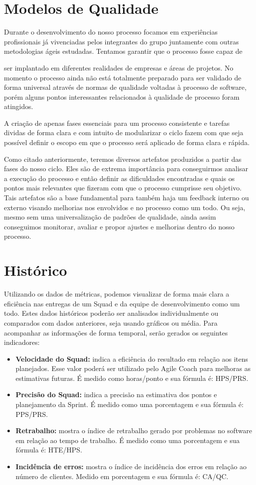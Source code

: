 \documentclass[	DIV=calc,%
							paper=a4,%
							fontsize=12pt,%
							onecolumn]{scrartcl}	 					%
\begin{document}
\section{Modelos de Qualidade}
Durante o desenvolvimento do nosso processo focamos em experiências profissionais já vivenciadas pelos integrantes do grupo juntamente com outras metodologias ágeis estudadas. Tentamos garantir que o processo fosse capaz de

ser implantado em diferentes realidades de empresas e áreas de projetos. No momento o processo ainda não está totalmente preparado para ser validado de forma universal através de normas de qualidade voltadas à processo de software, porém alguns pontos interessantes relacionados à qualidade de processo foram atingidos.

A criação de apenas fases essenciais para um processo consistente e tarefas dividas de forma clara e com intuito de modularizar o ciclo fazem com que seja possível definir o escopo em que o processo será aplicado de forma clara e rápida.

Como citado anteriormente, teremos diversos artefatos produzidos a partir das fases do nosso ciclo. Eles são de extrema importância para conseguirmos analisar a execução do processo e então definir as dificuldades encontradas e quais os pontos mais relevantes que fizeram com que o processo cumprisse seu objetivo. Tais artefatos são a base fundamental para também haja um feedback interno ou externo visando melhorias nos envolvidos e no processo como um todo. Ou seja, mesmo sem uma universalização de padrões de qualidade, ainda assim conseguimos monitorar, avaliar e propor ajustes e melhorias dentro do nosso processo.

\section{Histórico}
Utilizando os dados de métricas, podemos visualizar de forma mais clara a eficiência nas entregas de um Squad e da equipe de desenvolvimento como um todo. Estes dados históricos poderão ser analisados individualmente ou comparados com dados anteriores, seja usando gráficos ou média. Para acompanhar as informações de forma temporal, serão gerados os seguintes indicadores:
\begin{itemize}
	\item \textbf{Velocidade do Squad:} indica a eficiência do resultado em relação aos itens planejados. Esse valor poderá ser utilizado pelo Agile Coach para melhoras as estimativas futuras. É medido como horas/ponto e sua fórmula é: HPS/PRS.
	\item \textbf{Precisão do Squad:} indica a precisão na estimativa dos pontos e planejamento da Sprint. É medido como uma porcentagem e sua fórmula é:  PPS/PRS.
	\item \textbf{Retrabalho:} mostra o índice de retrabalho gerado por problemas no software em relação ao tempo de trabalho. É medido como uma porcentagem e sua fórmula é: HTE/HPS.
	\item \textbf{Incidência de erros:} mostra o índice de incidência dos erros em relação ao número de clientes. Medido em porcentagem e sua fórmula é: CA/QC.
\end{itemize}
\clearpage	\clearpage
\end{document}
